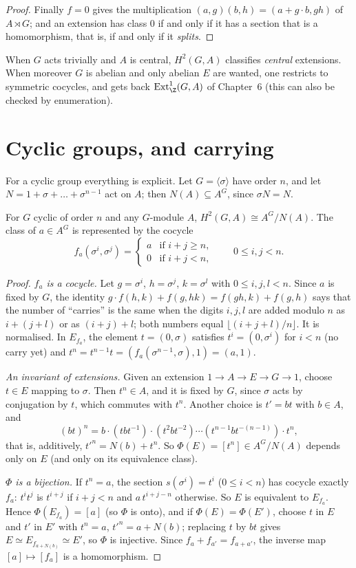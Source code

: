 \begin{proof}
Finally $f=0$ gives the multiplication $(a,g)(b,h)=(a+g\cdot b,gh)$ of $A\rtimes G$; and an extension has class $0$ if and only if it has a section that is a homomorphism, that is, if and only if it \emph{splits}.
\end{proof}

When $G$ acts trivially and $A$ is central, $H^2(G,A)$ classifies \emph{central} extensions. When moreover $G$ is abelian and only abelian $E$ are wanted, one restricts to symmetric cocycles, and gets back
$\operatorname{Ext}^1_\Z(G,A)$ of Chapter~6 (this can also be checked by enumeration).

\section{Cyclic groups, and carrying}

For a cyclic group everything is explicit. Let $G=\langle\sigma\rangle$ have order $n$, and let $N=1+\sigma+\dots+\sigma^{n-1}$ act on $A$; then $N(A)\subseteq A^G$, since $\sigma N=N$.

\begin{theorem}\label{thm:h2cyclic}
For $G$ cyclic of order $n$ and any $G$-module $A$, $H^2(G,A)\cong A^G/N(A)$. The class of $a\in A^G$ is represented by the cocycle
\[
f_a(\sigma^i,\sigma^j)=\begin{cases}a&\text{if }i+j\ge n,\\0&\text{if }i+j<n,\end{cases}\qquad0\le i,j<n.
\]
\end{theorem}

\begin{proof}
\emph{$f_a$ is a cocycle.} Let $g=\sigma^i$, $h=\sigma^j$, $k=\sigma^l$ with $0\le i,j,l<n$. Since $a$ is fixed by $G$, the identity $g\cdot f(h,k)+f(g,hk)=f(gh,k)+f(g,h)$ says that the number of ``carries'' is the same when the digits
$i,j,l$ are added modulo $n$ as $i+(j+l)$ or as $(i+j)+l$; both numbers equal $\lfloor(i+j+l)/n\rfloor$. It is normalised. In $E_{f_a}$, the element $t=(0,\sigma)$ satisfies $t^i=(0,\sigma^i)$ for $i<n$ (no carry yet) and
$t^n=t^{n-1}t=(f_a(\sigma^{n-1},\sigma),1)=(a,1)$.

\emph{An invariant of extensions.} Given an extension $1\to A\to E\to G\to1$, choose $t\in E$ mapping to $\sigma$. Then $t^n\in A$, and it is fixed by $G$, since $\sigma$ acts by conjugation by $t$, which commutes with $t^n$. Another choice is
$t'=bt$ with $b\in A$, and
\[
(bt)^n=b\cdot(tbt^{-1})\cdot(t^2bt^{-2})\cdots(t^{n-1}bt^{-(n-1)})\cdot t^n,
\]
that is, additively, $t'^n=N(b)+t^n$. So $\Phi(E)=[t^n]\in A^G/N(A)$ depends only on $E$ (and only on its equivalence class).

\emph{$\Phi$ is a bijection.} If $t^n=a$, the section $s(\sigma^i)=t^i$ ($0\le i<n$) has cocycle exactly $f_a$: $t^it^j$ is $t^{i+j}$ if $i+j<n$ and $a\,t^{i+j-n}$ otherwise. So $E$ is equivalent to $E_{f_a}$. Hence
$\Phi(E_{f_a})=[a]$ (so $\Phi$ is onto), and if $\Phi(E)=\Phi(E')$, choose $t$ in $E$ and $t'$ in $E'$ with $t^n=a$, $t'^n=a+N(b)$; replacing $t$ by $bt$ gives $E\simeq E_{f_{a+N(b)}}\simeq E'$, so $\Phi$ is injective.
Since $f_a+f_{a'}=f_{a+a'}$, the inverse map $[a]\mapsto[f_a]$ is a homomorphism.
\end{proof}

